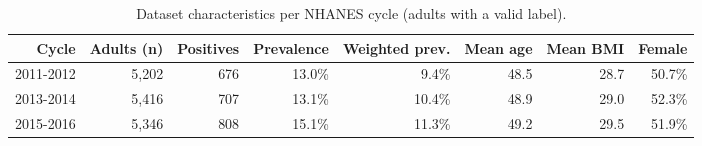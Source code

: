 \begin{table}[t]
\centering
\footnotesize
\caption{Dataset characteristics per NHANES cycle (adults with a valid label).}
\label{tab:dataset}
\begin{tabular}{rrrrrrrr}
\toprule
Cycle & Adults (n) & Positives & Prevalence & Weighted prev. & Mean age & Mean BMI & Female \\
\midrule
2011-2012 & 5,202 & 676 & 13.0\% & 9.4\% & 48.5 & 28.7 & 50.7\% \\
2013-2014 & 5,416 & 707 & 13.1\% & 10.4\% & 48.9 & 29.0 & 52.3\% \\
2015-2016 & 5,346 & 808 & 15.1\% & 11.3\% & 49.2 & 29.5 & 51.9\% \\
\bottomrule
\end{tabular}
\end{table}
